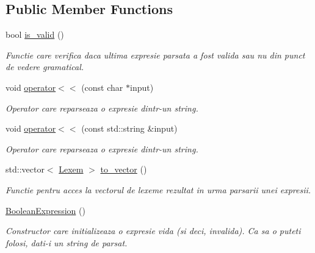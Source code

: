 \subsection*{Public Member Functions}
\begin{DoxyCompactItemize}
\item 
bool \hyperlink{classBooleanExpression_a15ce0a130f0ae05ba2e6a62a222b5c0e}{is\_\-valid} ()
\begin{DoxyCompactList}\small\item\em Functie care verifica daca ultima expresie parsata a fost valida sau nu din punct de vedere gramatical. \item\end{DoxyCompactList}\item 
\hypertarget{classBooleanExpression_a59d5385cc58e0d0452b96bed1f6a6984}{
void \hyperlink{classBooleanExpression_a59d5385cc58e0d0452b96bed1f6a6984}{operator$<$$<$} (const char $\ast$input)}
\label{classBooleanExpression_a59d5385cc58e0d0452b96bed1f6a6984}

\begin{DoxyCompactList}\small\item\em Operator care reparseaza o expresie dintr-\/un string. \item\end{DoxyCompactList}\item 
\hypertarget{classBooleanExpression_ad8e8ad03eae2b0813deee52ed00228a0}{
void \hyperlink{classBooleanExpression_ad8e8ad03eae2b0813deee52ed00228a0}{operator$<$$<$} (const std::string \&input)}
\label{classBooleanExpression_ad8e8ad03eae2b0813deee52ed00228a0}

\begin{DoxyCompactList}\small\item\em Operator care reparseaza o expresie dintr-\/un string. \item\end{DoxyCompactList}\item 
std::vector$<$ \hyperlink{classBooleanExpression_a299abbbf6a12738e2d9df792d50ccd76}{Lexem} $>$ \hyperlink{classBooleanExpression_a146ead302b7f836a40e598117ef57c6d}{to\_\-vector} ()
\begin{DoxyCompactList}\small\item\em Functie pentru acces la vectorul de lexeme rezultat in urma parsarii unei expresii. \item\end{DoxyCompactList}\item 
\hypertarget{classBooleanExpression_a499193b6f7b6a0242cfeb2563e96732e}{
\hyperlink{classBooleanExpression_a499193b6f7b6a0242cfeb2563e96732e}{BooleanExpression} ()}
\label{classBooleanExpression_a499193b6f7b6a0242cfeb2563e96732e}

\begin{DoxyCompactList}\small\item\em Constructor care initializeaza o expresie vida (si deci, invalida). Ca sa o puteti folosi, dati-\/i un string de parsat. \item\end{DoxyCompactList}\end{DoxyCompactItemize}
